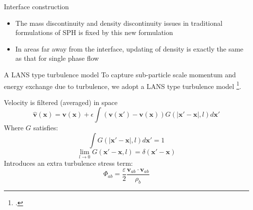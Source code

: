\documentclass{beamer}
\begin{document}
\begin{frame}{Interface construction}
\begin{minipage}{0.27 \textwidth}
\begin{figure}
\end{figure}
\end{minipage}

\begin{block}{}
  \begin{itemize}
    \item {The mass discontinuity and density discontinuity issues in traditional formulations of SPH is fixed by this new formulation
    } 
    \item {In areas far away from the interface, updating of density is exactly the same as that for single phase flow
    }
 \end{itemize}
\end{block}
\end{frame}

\begin{frame}{A LANS type turbulence model}
To capture sub-particle scale momentum and energy exchange due to turbulence, we adopt a LANS type turbulence model \footcite{monaghan2011turbulence}.\\
\noindent
\begin{minipage}{0.65 \textwidth}
Velocity is filtered (averaged) in space
\begin{equation}
\widehat{\textbf{v}}\left(\textbf{x}\right)=\textbf{v}\left(\textbf{x}\right)+ \epsilon \int \left(\textbf{v}\left(\textbf{x} \prime\right)-\textbf{v}\left(\textbf{x}\right)\right)G\left(\vert \textbf{x} \prime - \textbf{x} \vert, l\right) d\textbf{x} \prime
\end{equation}
Where $G$ satisfies:
\begin{equation}
\int G\left(\vert \textbf{x} \prime - \textbf{x} \vert, l\right) d\textbf{x} \prime =1
\end{equation}
\begin{equation}
\lim _{l \rightarrow 0} G\left(\textbf{x} \prime-\textbf{x}, l\right) =  \delta \left(\textbf{x} \prime - \textbf{x}\right)
\label{eq:SPH_kernel_delta}
\end{equation}
Introduces an extra turbulence stress term:
\begin{equation}
\Phi_{ab}=\dfrac{\varepsilon}{2} \dfrac{\textbf{v}_{ab} \cdot \textbf{v}_{ab}}{\rho_b} \label{eq:_LANS_trub_stress}
\end{equation}
\end{minipage}
%
\begin{minipage}{0.34 \textwidth}
\begin{figure}

\end{figure}
\end{minipage}
\end{frame}
\end{document}
